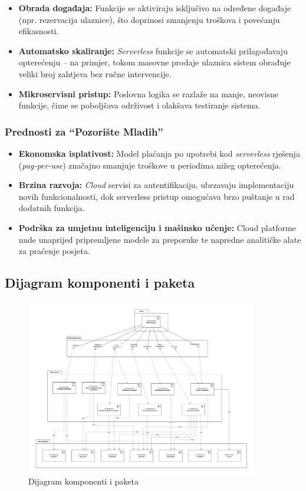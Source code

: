 \begin{itemize}[label=\textbullet]
    \item \textbf{Obrada događaja:} Funkcije se aktiviraju isključivo na određene događaje (npr. rezervacija ulaznice), što doprinosi smanjenju troškova i povećanju efikasnosti.
    \item \textbf{Automatsko skaliranje:} \textit{Serverless} funkcije se automatski prilagođavaju opterećenju – na primjer, tokom masovne prodaje ulaznica sistem obrađuje veliki broj zahtjeva bez ručne intervencije.
    \item \textbf{Mikroservisni pristup:} Poslovna logika se razlaže na manje, neovisne funkcije, čime se poboljšava održivost i olakšava testiranje sistema.
\end{itemize}

\subsubsection{Prednosti za \textquotedblleft Pozorište Mladih\textquotedblright{}}

\begin{itemize}[label=\textbullet]
    \item \textbf{Ekonomska isplativost:} Model plaćanja po upotrebi kod \textit{serverless} rješenja (\textit{pay-per-use}) značajno smanjuje troškove u periodima nižeg opterećenja.
    \item \textbf{Brzina razvoja:} \textit{Cloud} servisi za autentifikaciju, ubrzavaju implementaciju novih funkcionalnosti, dok serverless pristup omogućava brzo puštanje u rad dodatnih funkcija.
    \item \textbf{Podrška za umjetnu inteligenciju i mašinsko učenje:} Cloud platforme nude unaprijed pripremljene modele za preporuke te napredne analitičke alate za praćenje posjeta.
\end{itemize}

\subsection{Dijagram komponenti i paketa}

\begin{figure}[H]
    \centering
    \includegraphics[width=0.9\textwidth]{Slike/Arhitektura/component.png}
    \caption{Dijagram komponenti i paketa}
    \label{fig:arh1}
\end{figure}


